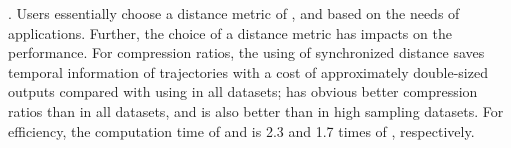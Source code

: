 . Users essentially choose a distance metric of \ped, \sed and \dad based on the needs of applications. Further, the choice of a distance metric has impacts on the performance.
For compression ratios, the using of synchronized distance \sed saves temporal information of trajectories with a cost of approximately double-sized outputs compared with using \ped in all datasets; \ped has obvious better compression ratios than \dad in all datasets, and \sed is also better than \dad in high sampling datasets.
For efficiency, the computation time of \ped and \sed is 2.3 and 1.7 times of \dad, respectively.



%
%
